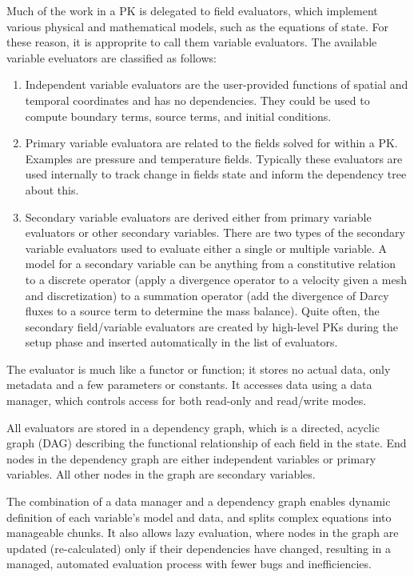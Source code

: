 Much of the work in a PK is delegated to field evaluators, which implement various 
physical and mathematical models, such as the equations of state. 
For these reason, it is approprite to call them variable evaluators.
The available variable eveluators are classified as follows:

\begin{enumerate}
\item Independent variable evaluators are the user-provided functions of spatial and temporal coordinates
      and has no dependencies.
      They could be used to compute boundary terms, source terms, and initial conditions. 
\item Primary variable evaluatora are related to the fields solved for within a PK.
      Examples are pressure and temperature fields.
      Typically these evaluators are used internally to track change in fields state and inform the 
      dependency tree about this.
\item Secondary variable evaluators are derived either from primary variable evaluators or other secondary variables. 
      There are two types of the secondary variable evaluators used to evaluate either a single or multiple variable.
      A model for a secondary variable can be anything from a constitutive relation to a discrete operator
      (apply a divergence operator to a velocity given a mesh and discretization) 
      to a summation operator (add the divergence of Darcy fluxes to a source term to determine the mass balance).
      Quite often, the secondary field/variable evaluators are created by high-level PKs during the setup phase 
      and inserted automatically in the list of evaluators. 
\end{enumerate}

The evaluator is much like a functor or function; it stores no actual data, only metadata and 
a few parameters or constants.
It accesses data using a data manager, which controls access for both read-only and read/write modes. 

All evaluators are stored in a dependency graph, which is a directed, acyclic graph (DAG) 
describing the functional relationship of each field in the state. 
End nodes in the dependency graph are either independent variables or primary variables. 
All other nodes in the graph are secondary variables.

The combination of a data manager and a dependency graph enables dynamic definition of each variable's model 
and data, and splits complex equations into manageable chunks. 
It also allows lazy evaluation, where nodes in the graph are updated (re-calculated) only if their dependencies
have changed, resulting in a managed, automated evaluation process with fewer bugs and inefficiencies.


